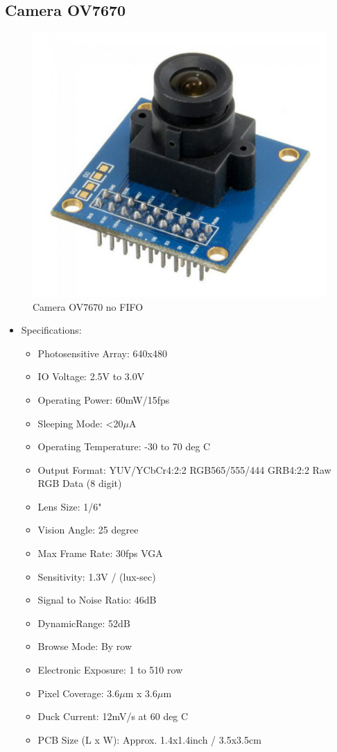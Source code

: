 \documentclass[D:/Latex/Internship/Report/Latex/Report.tex]{subfiles}
\begin{document}
\begin{otherlanguage}{english}
		\subsection{Camera OV7670}
			\begin{figure}[!ht]
				\centering
				\includegraphics[width = 0.6\linewidth]{Figure/OV7670.pdf}
				\caption{Camera OV7670 no FIFO}
			\end{figure}
			\begin{itemize}
				\item Specifications:
				\begin{itemize}
					\item Photosensitive Array: 640x480
					\item IO Voltage: 2.5V to 3.0V
					\item Operating Power: 60mW/15fps
					\item Sleeping Mode: <20$\mu$A
					\item Operating Temperature: -30 to 70 deg C
					\item Output Format: YUV/YCbCr4:2:2 RGB565/555/444 GRB4:2:2 Raw RGB Data (8 digit)
					\item Lens Size: 1/6"
					\item Vision Angle: 25 degree
					\item Max Frame Rate: 30fps VGA
					\item Sensitivity: 1.3V / (lux-sec)
					\item Signal to Noise Ratio: 46dB
					\item DynamicRange: 52dB
					\item Browse Mode: By row
					\item Electronic Exposure: 1 to 510 row
					\item Pixel Coverage: 3.6$\mu$m x 3.6$\mu$m
					\item Duck Current: 12mV/s at 60 deg C
					\item PCB Size (L x W): Approx. 1.4x1.4inch / 3.5x3.5cm
				\end{itemize}
			\end{itemize}
		\newpage

\end{otherlanguage}
\end{document}
